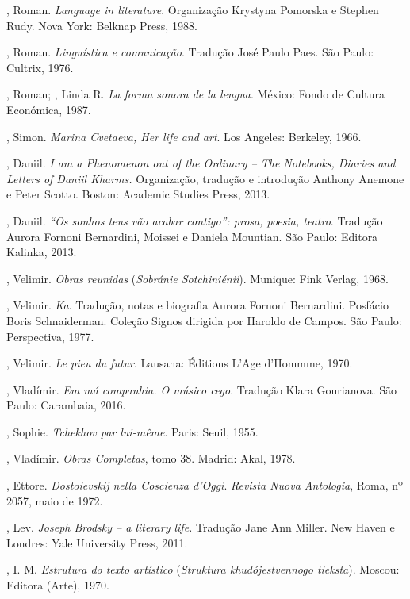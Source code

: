 \begin{Parskip}
{, Roman. \emph{Language in literature}. Organização Krystyna Pomorska e Stephen Rudy. Nova York: Belknap Press, 1988.

, Roman. \emph{Linguística e comunicação}. Tradução José Paulo Paes. São Paulo: Cultrix, 1976.

, Roman; , Linda R. \emph{La forma sonora de la lengua}. México: Fondo de Cultura Económica, 1987.

, Simon. \emph{Marina Cvetaeva, Her life and art}. Los Angeles: Berkeley, 1966.

, Daniil. \emph{I am a Phenomenon out of the Ordinary -- The
Notebooks, Diaries and Letters of Daniil Kharms.} Organização, tradução e introdução Anthony Anemone e Peter Scotto. Boston: Academic Studies Press, 2013.

, Daniil. \emph{``Os sonhos teus vão acabar contigo'': prosa, poesia, teatro}. Tradução Aurora Fornoni Bernardini, Moissei e Daniela Mountian. São Paulo: Editora Kalinka, 2013.

, Velimir. \emph{Obras reunidas} (\emph{Sobránie Sotchiniénii}). Munique: Fink Verlag, 1968.

, Velimir. \emph{Ka}. Tradução, notas e biografia Aurora Fornoni Bernardini. Posfácio Boris Schnaiderman. Coleção Signos dirigida por Haroldo de Campos. São Paulo: Perspectiva, 1977.

, Velimir. \emph{Le pieu du futur}. Lausana: Éditions L'Age d'Hommme, 1970.

, Vladímir. \emph{Em má companhia. O músico cego}. Tradução Klara Gourianova. São Paulo: Carambaia, 2016.

, Sophie. \emph{Tchekhov par lui-même}. Paris: Seuil, 1955. 

, Vladímir. \emph{Obras Completas}, tomo 38. Madrid: Akal, 1978.

, Ettore. \emph{Dostoievskij nella Coscienza d'Oggi}. \emph{Revista Nuova Antologia}, Roma, nº 2057, maio de 1972.

, Lev. \emph{Joseph Brodsky -- a literary life.} Tradução Jane Ann Miller. New Haven e Londres: Yale University Press, 2011.

, I. M. \emph{Estrutura do texto artístico} (\emph{Struktura khudójestvennogo tieksta}). Moscou: Editora (Arte), 1970.

}
\end{Parskip}
